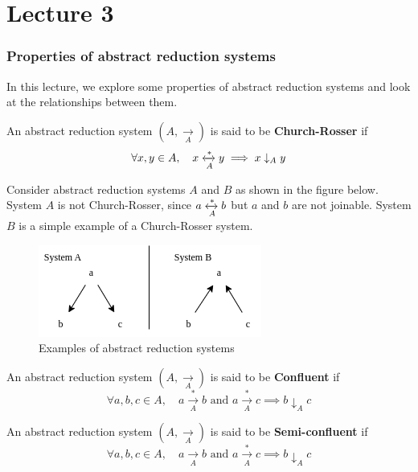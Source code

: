 \chapter{Lecture 3}

\subsection{Properties of abstract reduction systems}

In this lecture, we explore some properties of abstract reduction systems and look at the relationships between them.

\begin{definition}
    An abstract reduction system $( A, \xrightarrow[A]{} )$ is said to be \textbf{Church-Rosser} if $$\forall x, y \in A, \quad x \xleftrightarrow[A]{*} y \implies x \downarrow_A y$$
\end{definition}

Consider abstract reduction systems $A$ and $B$ as shown in the figure below. System $A$ is not Church-Rosser, since $a \xleftrightarrow[A]{*} b$ but $a$ and $b$ are not joinable. System $B$ is a simple example of a Church-Rosser system.

\begin{figure}[htbp]
    \center
    \includegraphics[scale=0.8]{images/lecture1/CR.png}
    \caption{Examples of abstract reduction systems}
\end{figure}


\begin{definition}
    An abstract reduction system $( A, \xrightarrow[A]{} )$ is said to be \textbf{Confluent} if $$\forall a, b, c \in A, \quad a \xrightarrow[A]{*} b \text{ and }  a \xrightarrow[A]{*} c \implies b \downarrow_A c$$
\end{definition}

\begin{definition}
    An abstract reduction system $( A, \xrightarrow[A]{} )$ is said to be \textbf{Semi-confluent} if $$\forall a, b, c \in A, \quad a \xrightarrow[A]{} b \text{ and }  a \xrightarrow[A]{*} c \implies b \downarrow_A c$$
\end{definition}

